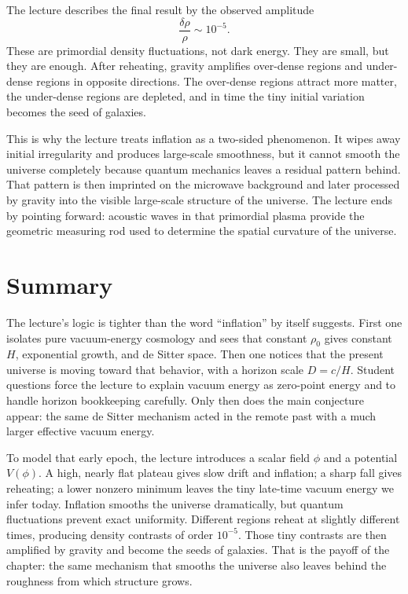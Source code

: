 The lecture describes the final result by the observed amplitude
\begin{equation}
\frac{\delta\rho}{\rho}\sim 10^{-5}.
\end{equation}
These are primordial density fluctuations, not dark energy. They are small, but they are enough. After reheating, gravity amplifies over-dense regions and under-dense regions in opposite directions. The over-dense regions attract more matter, the under-dense regions are depleted, and in time the tiny initial variation becomes the seed of galaxies.

This is why the lecture treats inflation as a two-sided phenomenon. It wipes away initial irregularity and produces large-scale smoothness, but it cannot smooth the universe completely because quantum mechanics leaves a residual pattern behind. That pattern is then imprinted on the microwave background and later processed by gravity into the visible large-scale structure of the universe. The lecture ends by pointing forward: acoustic waves in that primordial plasma provide the geometric measuring rod used to determine the spatial curvature of the universe.

\section{Summary}

The lecture's logic is tighter than the word ``inflation'' by itself suggests. First one isolates pure vacuum-energy cosmology and sees that constant \(\rho_0\) gives constant \(H\), exponential growth, and de Sitter space. Then one notices that the present universe is moving toward that behavior, with a horizon scale \(D=c/H\). Student questions force the lecture to explain vacuum energy as zero-point energy and to handle horizon bookkeeping carefully. Only then does the main conjecture appear: the same de Sitter mechanism acted in the remote past with a much larger effective vacuum energy.

To model that early epoch, the lecture introduces a scalar field \(\phi\) and a potential \(V(\phi)\). A high, nearly flat plateau gives slow drift and inflation; a sharp fall gives reheating; a lower nonzero minimum leaves the tiny late-time vacuum energy we infer today. Inflation smooths the universe dramatically, but quantum fluctuations prevent exact uniformity. Different regions reheat at slightly different times, producing density contrasts of order \(10^{-5}\). Those tiny contrasts are then amplified by gravity and become the seeds of galaxies. That is the payoff of the chapter: the same mechanism that smooths the universe also leaves behind the roughness from which structure grows.